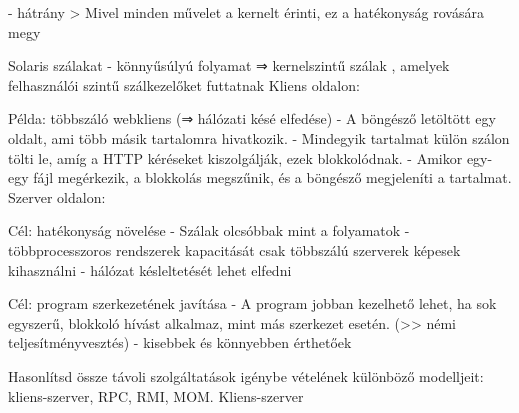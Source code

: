 \documentclass[twoside, a4paper, 12pt]{article}
\begin{document}
\begin{description}
                                                                        - hátrány
                                                                        > Mivel minden művelet a kernelt érinti, ez a hatékonyság rovására megy
                                                                    \item Solaris szálakat
                                                                        - könnyűsúlyú folyamat ⇒ kernelszintű szálak , amelyek felhasználói szintű szálkezelőket futtatnak
                                                                        Kliens oldalon:
                                                                    \item Példa: többszáló webkliens (⇒ hálózati késé elfedése)
                                                                        - A böngésző letöltött egy oldalt, ami több másik tartalomra hivatkozik.
                                                                        - Mindegyik tartalmat külön szálon tölti le, amíg a HTTP kéréseket kiszolgálják, ezek blokkolódnak.
                                                                        - Amikor egy-egy fájl megérkezik, a blokkolás megszűnik, és a böngésző megjeleníti a tartalmat.
                                                                        Szerver oldalon:
                                                                    \item Cél: hatékonyság növelése
                                                                        - Szálak olcsóbbak mint a folyamatok
                                                                        - többprocesszoros rendszerek kapacitását csak többszálú szerverek képesek kihasználni
                                                                        - hálózat késleltetését lehet elfedni
                                                                    \item Cél: program szerkezetének javítása
                                                                        - A program jobban kezelhető lehet, ha sok egyszerű, blokkoló hívást alkalmaz, mint más szerkezet esetén. (>> némi teljesítményvesztés)
                                                                        - kisebbek és könnyebben érthetőek 
                                                                    \item  Hasonlítsd össze távoli szolgáltatások igénybe vételének különböző modelljeit: kliens-szerver, RPC, RMI, MOM.
                                                                        Kliens-szerver

\end{description}
\end{document}
